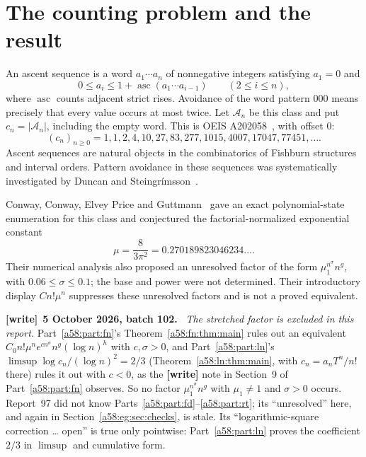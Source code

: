 \documentclass[11pt,letterpaper]{article}
\theoremstyle{remark}
\newcommand{\asc}{\operatorname{asc}}
\newcommand{\muval}{\mu}
\newcommand{\cA}{\mathcal A}
\newenvironment{writenote}[1][]{\par\smallskip\begingroup\small
 \noindent\textbf{[write]}\if\relax\detokenize{#1}\relax\else~\textbf{#1.}\fi\ }%
 {\par\endgroup\smallskip}
\begin{document}
\section{The counting problem and the result}\label{a58:eg:sec:context}
An ascent sequence is a word $a_1\cdots a_n$ of nonnegative integers satisfying $a_1=0$ and
\[
 0\le a_i\le1+\asc(a_1\cdots a_{i-1})\qquad(2\le i\le n),
\]
where $\asc$ counts adjacent strict rises. Avoidance of the word pattern 000 means precisely that every value occurs at most twice. Let $\cA_n$ be this class and put $c_n=|\cA_n|$, including the empty word. This is OEIS A202058~\cite{OEIS}, with offset 0:
\[
(c_n)_{n\ge0}=1,1,2,4,10,27,83,277,1015,4007,17047,77451,\ldots.
\]
Ascent sequences are natural objects in the combinatorics of Fishburn structures and interval orders. Pattern avoidance in these sequences was systematically investigated by Duncan and Steingr\'imsson~\cite{DS2011}.

Conway, Conway, Elvey Price and Guttmann~\cite{CCEG} gave an exact polynomial-state enumeration for this class and conjectured the factorial-normalized exponential constant
\begin{equation}\label{a58:eg:eq:mu}
 \muval=\frac8{3\pi^2}=0.270189823046234\ldots.
\end{equation}
Their numerical analysis also proposed an unresolved factor of the form $\mu_1^{n^\sigma}n^g$, with $0.06\le\sigma\le0.1$; the base and power were not determined. Their introductory display $C n!\muval^n$ suppresses these unresolved factors and is not a proved equivalent.

\begin{writenote}[5 October 2026, batch 102]
\emph{The stretched factor is excluded in this report.} Part~\ref{a58:part:fn}'s Theorem~\ref{a58:fn:thm:main} rules out an equivalent $C_0n!\mu^ne^{cn^\sigma}n^g(\log n)^h$ with $c,\sigma>0$, and Part~\ref{a58:part:ln}'s $\limsup\log c_n/(\log n)^2=2/3$ (Theorem~\ref{a58:ln:thm:main}, with $c_n=a_nT^n/n!$ there) rules it out with $c<0$, as the \textbf{[write]} note in Section~9 of Part~\ref{a58:part:fn} observes. So no factor $\mu_1^{n^\sigma}n^g$ with $\mu_1\ne1$ and $\sigma>0$ occurs. Report~97 did not know Parts~\ref{a58:part:fd}--\ref{a58:part:rt}; its ``unresolved'' here, and again in Section~\ref{a58:eg:sec:checks}, is stale. Its ``logarithmic-square correction \ldots{} open'' is true only pointwise: Part~\ref{a58:part:ln} proves the coefficient $2/3$ in $\limsup$ and cumulative form.
\end{writenote}
\end{document}
